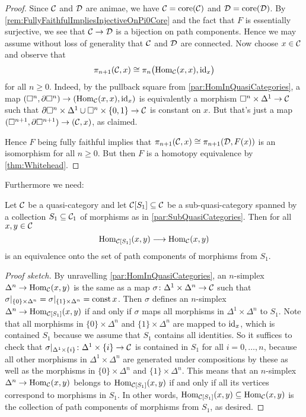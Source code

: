 \begin{proof}
	Since $\mathcal{C}$ and $\mathcal{D}$ are animae, we have $\mathcal{C}=\operatorname{core}(\mathcal{C})$ and $\mathcal{D}=\operatorname{core}(\mathcal{D})$. By \cref{rem:FullyFaithfulImpliesInjectiveOnPi0Core} and the fact that $F$ is essentially surjective, we see that $\mathcal{C}\rightarrow\mathcal{D}$ is a bijection on path components. Hence we may assume without loss of generality that $\mathcal{C}$ and $\mathcal{D}$ are connected. Now choose $x\in\mathcal{C}$ and observe that
	\begin{equation*}
		\pi_{n+1}(\mathcal{C},x)\cong \pi_n\bigl(\operatorname{Hom}_{\mathcal{C}}(x,x),\operatorname{id}_x\bigr)
	\end{equation*}
	for all $n\geqslant 0$. Indeed, by the pullback square from \cref{par:HomInQuasiCategories}, a map $(\square^n,\partial\square^n)\rightarrow (\operatorname{Hom}_{\mathcal{C}}(x,x),\operatorname{id}_x)$ is equivalently a morphism $\square^n\times\Delta^1\rightarrow \mathcal{C}$ such that $\partial \square^n\times\Delta^1\cup\square^n\times\{0,1\}\rightarrow \mathcal{C}$ is constant on $x$. But that's just a map $(\square^{n+1},\partial\square^{n+1})\rightarrow(\mathcal{C},x)$, as claimed.
	
	Hence $F$ being fully faithful implies that $\pi_{n+1}(\mathcal{C},x)\cong\pi_{n+1}(\mathcal{D},F(x))$ is an isomorphism for all $n\geqslant 0$. But then $F$ is a homotopy equivalence by \cref{thm:Whitehead}.
\end{proof}
Furthermore we need:
\begin{lem}\label{lem:NonFullSubcategory}
	Let $\mathcal{C}$ be a quasi-category and let $\mathcal{C}[S_1]\subseteq \mathcal{C}$ be a  sub-quasi-category spanned by a collection $S_1\subseteq \mathcal{C}_1$ of morphisms as in \cref{par:SubQuasiCategories}. Then for all $x,y\in\mathcal{C}$
	\begin{equation*}
		\operatorname{Hom}_{\mathcal{C}[S_1]}(x,y)\longrightarrow \operatorname{Hom}_{\mathcal{C}}(x,y)
	\end{equation*}
	is an equivalence onto the set of path components of morphisms from $S_1$.
\end{lem}
\begin{proof}[Proof sketch]
	By unravelling \cref{par:HomInQuasiCategories}, an $n$-simplex $\Delta^n\rightarrow \operatorname{Hom}_{\mathcal{C}}(x,y)$ is the same as a map $\sigma\colon \Delta^1\times\Delta^n\rightarrow \mathcal{C}$ such that $\sigma|_{\{0\}\times \Delta^n}=\sigma|_{\{1\}\times\Delta^n}=\operatorname{const} x$. Then $\sigma$ defines an $n$-simplex $\Delta^n\rightarrow \operatorname{Hom}_{\mathcal{C}[S_1]}(x,y)$ if and only if $\sigma$ maps all morphisms in $\Delta^1\times\Delta^n$ to $S_1$. Note that all morphisms in $\{0\}\times\Delta^n$ and $\{1\}\times\Delta^n$ are mapped to $\operatorname{id}_x$, which is contained $S_1$ because we assume that $S_1$ contains all identities. So it suffices to check that $\sigma|_{\Delta^1\times\{i\}}\colon \Delta^1\times\{i\}\rightarrow \mathcal{C}$ is contained in $S_1$ for all $i=0,\dotsc,n$, because all other morphisms in $\Delta^1\times\Delta^n$ are generated under compositions by these as well as the morphisms in $\{0\}\times \Delta^n$ and $\{1\}\times\Delta^n$. This means that an $n$-simplex $\Delta^n\rightarrow \operatorname{Hom}_{\mathcal{C}}(x,y)$ belongs to $\operatorname{Hom}_{\mathcal{C}[S_1]}(x,y)$ if and only if all its vertices correspond to morphisms in $S_1$. In other words, $\operatorname{Hom}_{\mathcal{C}[S_1]}(x,y)\subseteq\operatorname{Hom}_{\mathcal{C}}(x,y)$ is the collection of path components of morphisms from $S_1$, as desired.
\end{proof}

